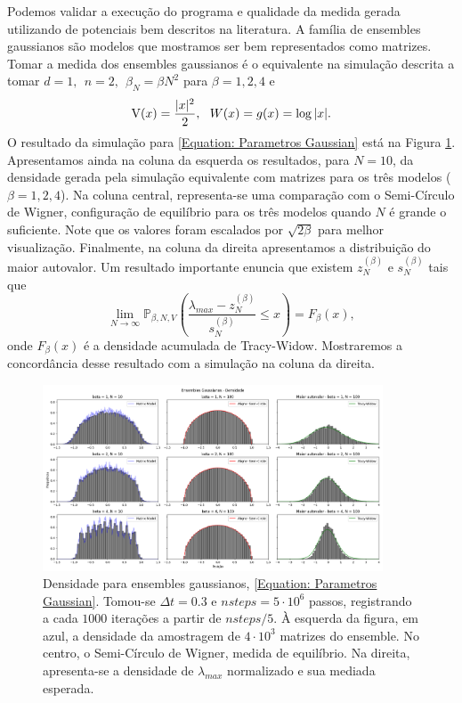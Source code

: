 \documentclass[12pt]{report}
\begin{document}
Podemos validar a execução do programa e qualidade da medida gerada utilizando de potenciais bem descritos na literatura. A família de ensembles gaussianos são modelos que mostramos ser bem representados como matrizes. Tomar a medida dos ensembles gaussianos é o equivalente na simulação descrita a tomar $d = 1, \ \  n = 2, \ \ \beta_N = \beta N^2$ para $\beta = 1,2,4$ e 
\begin{equation}
	\operatorname{V}(x)=\frac{|x|^2}{2}, \ \ W(x) = g(x) = \log{|x|}.
	\label{Equation: Parametros Gaussian}
\end{equation}
O resultado da simulação para \ref{Equation: Parametros Gaussian} está na Figura \ref{Figura: Gaussian}. Apresentamos ainda na coluna da esquerda os resultados, para $N=10$, da densidade gerada pela simulação equivalente com matrizes para os três modelos ($\beta = 1,2,4$). Na coluna central, representa-se uma comparação com o Semi-Círculo de Wigner, configuração de equilíbrio para os três modelos quando $N$ é grande o suficiente. Note que os valores foram escalados por $\sqrt{2 \beta}$ para melhor visualização. Finalmente, na coluna da direita apresentamos a distribuição do maior autovalor. Um resultado importante  \cite{Tracy} enuncia que existem $z_{N}^{(\beta)}$ e $s_N^{(\beta)}$ tais que $$\lim_{N \to \infty} \mathbb{P}_{\beta,N,V} \left( \frac{\lambda_{max} - z_{N}^{(\beta)}}{s_N^{(\beta)}} \leq x \right) = F_{\beta}(x),$$ onde $F_{\beta}(x)$ é a densidade acumulada de Tracy-Widow. Mostraremos a concordância desse resultado com a simulação na coluna da direita.

\begin{figure}[ht!]
	\centering
	\includegraphics[width=0.9\textwidth]{Assets/validationGaussianTracy.png}
	\caption{Densidade para ensembles gaussianos, \ref{Equation: Parametros Gaussian}. Tomou-se $\Delta t = 0.3$ e $nsteps = 5\cdot10^6$ passos, registrando a cada $1000$ iterações a partir de $nsteps/5$. À esquerda da figura, em azul, a densidade da amostragem de $4\cdot10^3$ matrizes do ensemble. No centro, o Semi-Círculo de Wigner, medida de equilíbrio. Na direita, apresenta-se a densidade de $\lambda_{max}$ normalizado e sua mediada esperada.}
	\label{Figura: Gaussian}
\end{figure}
\end{document}
